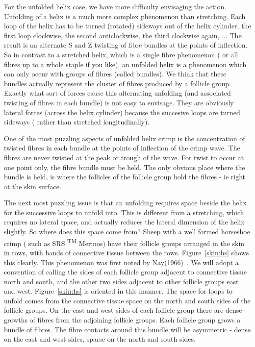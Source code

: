 \documentclass[titlepage,10pt]{article}  %
\begin{document}
For the unfolded helix case, we have more difficulty envisaging the action. Unfolding of a helix is a much more complex phenomenon than stretching. Each loop of the helix has to be turned (rotated) sideways out of the helix cylinder, the first loop clockwise, the second anticlockwise, the third clockwise again, ... The result is an alternate S and Z twisting of fibre bundles at the points of inflection. So in contrast to a stretched helix, which is a single fibre phenomenon ( or all fibres up to a whole staple if you like), an unfolded helix is a phenomenon which can only occur with groups of fibres (called bundles). We think that these bundles actually represent the cluster of fibres produced by a follicle group.
 Exactly what sort of forces cause this alternating unfolding (and associated twisting of fibres in each bundle) is not easy to envisage. They are obviously lateral forces (across the helix cylinder) because the succesive loops are turned sideways ( rather than stretched longitudinally).

One of the most puzzling aspects of unfolded helix crimp is the concentration of twisted fibres in each bundle at the points of inflection of the crimp wave. The fibres are never twisted at the peak or trough of the wave. For twist to occur at one point only, the fibre bundle must be held. The only obvious place where the bundle is held, is where the follicles of the follicle group hold the fibres - ie right at the skin surface.

The next most puzzling issue is that an unfolding requires space beside the helix for the successive loops to unfold into. This is different from a stretching, which requires no lateral space, and actually reduces the lateral dimension of the helix slightly. So where does this space come from? Sheep with a well formed horseshoe crimp ( such as SRS \textsuperscript{TM} Merinos) have their follicle groups arranged in the skin in rows, with bands of connective tissue between the rows. Figure~\ref{skin:hs} shows this clearly. This phenomenon was first noted by Nay(1966)~\cite{nay:66}. We will adopt a convention of calling the sides of each follicle group adjacent to connective tissue north and south, and the other two sides adjacent to other follicle groups east and west. Figure~\ref{skin:hs} is oriented in this manner. The space for loops to unfold comes from  the connective tissue space on the north and south sides of the follicle groups. On the east and west sides of each follicle group there are dense growths of fibres from the adjoining follicle groups. Each follicle group grows a bundle of fibres. The fibre contacts around this bundle will be asymmetric - dense on the east and west sides, sparse on the north and south sides.
\end{document}

